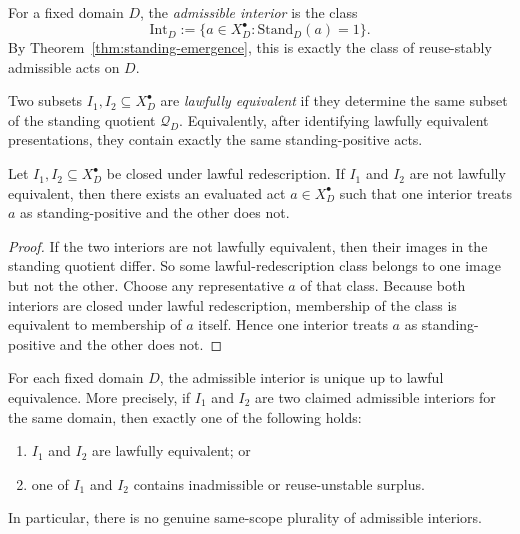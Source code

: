 \begin{definition}
For a fixed domain $D$, the \emph{admissible interior} is the class
\[
\mathrm{Int}_D := \{a\in X_D^{\bullet} : \mathrm{Stand}_D(a)=1\}.
\]
By Theorem~\ref{thm:standing-emergence}, this is exactly the class of reuse-stably admissible acts on $D$.
\end{definition}

\begin{definition}
Two subsets $I_1,I_2\subseteq X_D^{\bullet}$ are \emph{lawfully equivalent} if they determine the same subset of the standing quotient $\mathcal Q_D$. Equivalently, after identifying lawfully equivalent presentations, they contain exactly the same standing-positive acts.
\end{definition}

\begin{lemma}
\label{lem:difference-interiors-standing-split}
Let $I_1,I_2\subseteq X_D^{\bullet}$ be closed under lawful redescription. If $I_1$ and $I_2$ are not lawfully equivalent, then there exists an evaluated act $a\in X_D^{\bullet}$ such that one interior treats $a$ as standing-positive and the other does not.
\end{lemma}

\begin{proof}
If the two interiors are not lawfully equivalent, then their images in the standing quotient differ. So some lawful-redescription class belongs to one image but not the other. Choose any representative $a$ of that class. Because both interiors are closed under lawful redescription, membership of the class is equivalent to membership of $a$ itself. Hence one interior treats $a$ as standing-positive and the other does not.\cite{MaleyNecessity}
\end{proof}

\begin{theorem}
\label{thm:unique-admissible-interior}
For each fixed domain $D$, the admissible interior is unique up to lawful equivalence. More precisely, if $I_1$ and $I_2$ are two claimed admissible interiors for the same domain, then exactly one of the following holds:
\begin{enumerate}
  \item $I_1$ and $I_2$ are lawfully equivalent; or
  \item one of $I_1$ and $I_2$ contains inadmissible or reuse-unstable surplus.
\end{enumerate}
In particular, there is no genuine same-scope plurality of admissible interiors.
\end{theorem}

